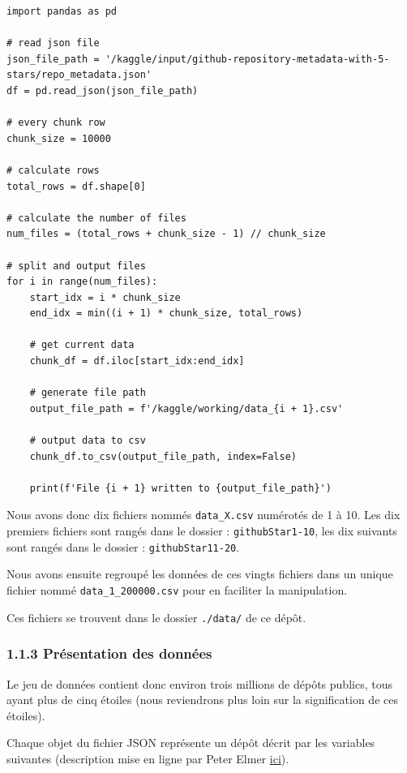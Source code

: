 \documentclass[
]{article}
\begin{document}
\begin{verbatim}
import pandas as pd

# read json file
json_file_path = '/kaggle/input/github-repository-metadata-with-5-stars/repo_metadata.json'
df = pd.read_json(json_file_path)

# every chunk row
chunk_size = 10000

# calculate rows
total_rows = df.shape[0]

# calculate the number of files
num_files = (total_rows + chunk_size - 1) // chunk_size

# split and output files
for i in range(num_files):
    start_idx = i * chunk_size
    end_idx = min((i + 1) * chunk_size, total_rows)
    
    # get current data
    chunk_df = df.iloc[start_idx:end_idx]
    
    # generate file path
    output_file_path = f'/kaggle/working/data_{i + 1}.csv'
    
    # output data to csv
    chunk_df.to_csv(output_file_path, index=False)

    print(f'File {i + 1} written to {output_file_path}')
\end{verbatim}

Nous avons donc dix fichiers nommés \texttt{data\_X.csv} numérotés de 1
à 10. Les dix premiers fichiers sont rangés dans le dossier :
\texttt{githubStar1-10}, les dix suivants sont rangés dans le dossier :
\texttt{githubStar11-20}.

Nous avons ensuite regroupé les données de ces vingts fichiers dans un
unique fichier nommé \texttt{data\_1\_200000.csv} pour en faciliter la
manipulation.

Ces fichiers se trouvent dans le dossier \texttt{./data/} de ce dépôt.

\subsubsection{1.1.3 Présentation des
données}\label{pruxe9sentation-des-donnuxe9es}

Le jeu de données contient donc environ trois millions de dépôts
publics, tous ayant plus de cinq étoiles (nous reviendrons plus loin sur
la signification de ces étoiles).

Chaque objet du fichier JSON représente un dépôt décrit par les
variables suivantes (description mise en ligne par Peter Elmer
\href{https://github.com/pelmers/github-repository-metadata}{ici}).
\end{document}
